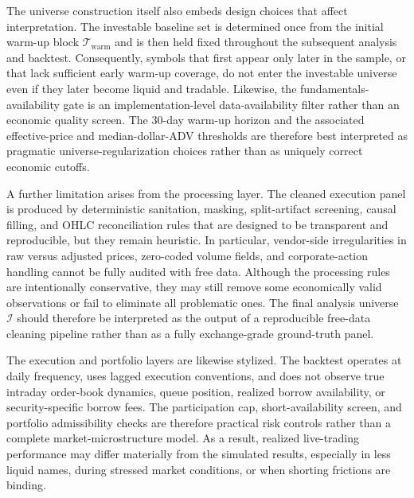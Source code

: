 \documentclass[11pt,a4paper]{article}
\begin{document}
The universe construction itself also embeds design choices that affect
interpretation. The investable baseline set is determined once from the initial
warm-up block \(\mathcal T_{\mathrm{warm}}\) and is then held fixed throughout
the subsequent analysis and backtest. Consequently, symbols that first appear
only later in the sample, or that lack sufficient early warm-up coverage, do not
enter the investable universe even if they later become liquid and tradable.
Likewise, the fundamentals-availability gate is an implementation-level
data-availability filter rather than an economic quality screen. The \(30\)-day
warm-up horizon and the associated effective-price and median-dollar-ADV
thresholds are therefore best interpreted as pragmatic universe-regularization
choices rather than as uniquely correct economic cutoffs.

A further limitation arises from the processing layer. The cleaned execution
panel is produced by deterministic sanitation, masking, split-artifact
screening, causal filling, and OHLC reconciliation rules that are designed to be
transparent and reproducible, but they remain heuristic. In particular,
vendor-side irregularities in raw versus adjusted prices, zero-coded volume
fields, and corporate-action handling cannot be fully audited with free data.
Although the processing rules are intentionally conservative, they may still
remove some economically valid observations or fail to eliminate all problematic
ones. The final analysis universe \(\mathcal I\) should therefore be interpreted
as the output of a reproducible free-data cleaning pipeline rather than as a
fully exchange-grade ground-truth panel.

The execution and portfolio layers are likewise stylized. The backtest operates
at daily frequency, uses lagged execution conventions, and does not observe true
intraday order-book dynamics, queue position, realized borrow availability, or
security-specific borrow fees. The participation cap, short-availability screen,
and portfolio admissibility checks are therefore practical risk controls rather
than a complete market-microstructure model. As a result, realized live-trading
performance may differ materially from the simulated results, especially in less
liquid names, during stressed market conditions, or when shorting frictions are
binding.
\end{document}
